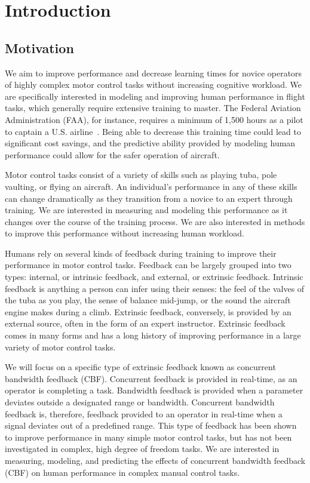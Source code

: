 \chapter{Introduction}

\section{Motivation}
\label{sec:intro_overview}
We aim to improve performance and decrease learning times for novice operators of highly complex motor control tasks without increasing cognitive workload.
We are specifically interested in modeling and improving human performance in flight tasks, which generally require extensive training to master.
The Federal Aviation Administration (FAA), for instance, requires a minimum of 1,500 hours as a pilot to captain a U.S. airline~\citep{FAA}.
Being able to decrease this training time could lead to significant cost savings, and the predictive ability provided by modeling human performance could allow for the safer operation of aircraft.

Motor control tasks consist of a variety of skills such as playing tuba, pole vaulting, or flying an aircraft.
An individual's performance in any of these skills can change dramatically as they transition from a novice to an expert through training.
We are interested in measuring and modeling this performance as it changes over the course of the training process.
We are also interested in methods to improve this performance without increasing human workload.

Humans rely on several kinds of feedback during training to improve their performance in motor control tasks.
Feedback can be largely grouped into two types: internal, or intrinsic feedback, and external, or extrinsic feedback.
Intrinsic feedback is anything a person can infer using their senses: the feel of the valves of the tuba as you play, the sense of balance mid-jump, or the sound the aircraft engine makes during a climb.
Extrinsic feedback, conversely, is provided by an external source, often in the form of an expert instructor.
Extrinsic feedback comes in many forms and has a long history of improving performance in a large variety of motor control tasks.

We will focus on a specific type of extrinsic feedback known as concurrent bandwidth feedback (CBF).
Concurrent feedback is provided in real-time, as an operator is completing a task.
Bandwidth feedback is provided when a parameter deviates outside a designated range or bandwidth.
Concurrent bandwidth feedback is, therefore, feedback provided to an operator in real-time when a signal deviates out of a predefined range.
This type of feedback has been shown to improve performance in many simple motor control tasks, but has not been investigated in complex, high degree of freedom tasks.
We are interested in measuring, modeling, and predicting the effects of concurrent bandwidth feedback (CBF) on human performance in complex manual control tasks.

